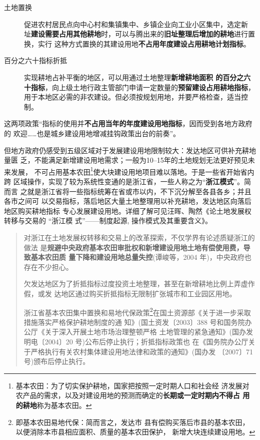 \begin{description}
\item[土地置换] 促进农村居民点向中心村和集镇集中、乡镇企业向工业小区集中，选定新
  址\textbf{建设需要占用其他耕地}时，可以与腾出来的\textbf{旧址整理后增加的耕地}进行置换，实行
  这种方式置换的其建设用地\textbf{不占用年度建设占用耕地计划指标}。


\item[百分之六十指标折抵] 实现耕地占补平衡的地区，可以用通过土地整理\textbf{新增耕地面积
  的百分之六十指标}，向上级土地行政主管部门申请一定数量的\textbf{预留建设占用耕地指标}，
  用于本地区必需的非农建设。但必须按规划用地，并要严格检查，适当控制。
\end{description}

这两项政策“指标的使用并\textbf{不占用当年的年度建设用地指标}，因而受到各地方政府的
欢迎……也是城乡建设用地增减挂钩政策出台的前奏”。

但地方政府仍感受到五级区域对于发展建设用地限制较大：发达地区可供补充耕地量匮
乏，不能满足新增建设用地需求；一般为10--15年的土地规划无法更好预见未来发展，
不可占用基本农田\footnote{基本农田：为了切实保护耕地，国家把按照一定时期人口和社会经
  济发展对农产品的需求，以及对建设用地的预测而确定的\textbf{长期或一定时期内不得占
    用的耕地}称为基本农田。}使大块建设用地项目难以落地。于是一些省开始省内跨
区域操作，实现了较为系统性变通的是浙江省，一些人称之为“\textbf{浙江模式}”。简而言
之就是浙江省将一些指标统筹在省或市以内，不下沉分解至各县各乡；并且各市之间可
以交易指标，落后地区大量土地整理用以补充耕地，发达地区向落后地区购买耕地指标
专心发展建设用地。详细了解可见汪晖、陶然《论土地发展权转移与交易的 “浙江模
式”——制度起源, 操作模式及其重要含义》。


\begin{quotation}
  对浙江在土地发展权转移和交易上的改革探索，不仅学界有论述质疑浙江的做法
  是\textbf{规避中央政府基本农田审批权和新增建设用地土地有偿使用费，导致基本农田质
    量下降和建设用地总量失控}(谭峻等，2004 年)，中央政府也存在不少担心。

  欠发达地区为了折抵指标过度投资土地整理，甚至在新增耕地比例上弄虚作假，或发
  达地区通过购买折抵指标无限制扩张城市和工业园区用地。

  浙江省基本农田集中置换和易地代保政策\footnote{即基本农田易地代保：简而言之，发达市
    县有偿购买落后市县的基本农田，以便消除本市县相应面积、质量的基本农田保护，
    新增大块连续建设用地。}在国土资源部《关于进一步采取措施落实严格保护耕地制度的通
  知》(国土资发〔2003〕388 号和国务院办公厅《关于深入开展土地市场治理整顿严格
  土地管理的紧急通知》(国办发明电〔2004〕20 号)公布后停止执行；折抵指标政策也
  在《国务院办公厅关于严格执行有关农村集体建设用地法律和政策的通知》(国办发
  〔2007〕71 号)颁布后停止执行。\cite{wangzhejiang}
\end{quotation}


